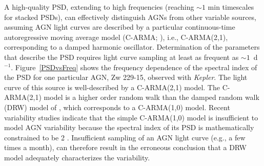 A high-quality PSD, extending to high frequencies (reaching $\sim 1$ min
timescales for stacked PSDs), can effectively distinguish AGNs from other
variable sources, assuming AGN light curves are described by a particular
continuous-time autoregressive moving average model (C-ARMA; \citet{KellyEtal14}),
i.e., C-ARMA(2,1), corresponding to a damped harmonic oscillator.
%
Determination of the parameters that describe the PSD requires light curve
sampling at least as frequent as $\sim1$~d$^{-1}$. Figure~\ref{PSDvsFreq} shows
the frequency dependence of the spectral index of the PSD for one particular AGN,
Zw 229-15, observed with {\em Kepler}. The light curve of this source is
well-described by a C-ARMA(2,1) model. The C-ARMA(2,1) model is a higher order
random walk than the damped random walk (DRW) model of \citet{Kelly09}, which
corresponds to a C-ARMA(1,0) model. Recent variability studies indicate that
the simple C-ARMA(1,0) model is insufficient to model AGN variability because
the spectral index of its PSD is mathematically constrained to be 2
\citep{KellyEtal14,Kasliwal15,Simm15}. Insufficient sampling of an AGN light
curve (e.g., a few times a month), can therefore result in the erroneous conclusion
that a DRW model adequately characterizes the variability.

